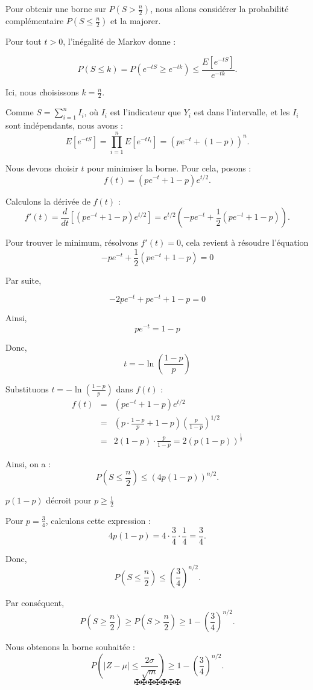 Pour obtenir une borne sur $P \left( S > \frac{n}{2} \right)$, nous allons
consid{\'e}rer la probabilit{\'e} compl{\'e}mentaire $P \left( S \leq
\frac{n}{2} \right)$ et la majorer.

Pour tout $t > 0$, l'in{\'e}galit{\'e} de Markov donne :


\[ P (S \leq k) = P (e^{- tS} \geq e^{- tk}) \leq \frac{E [e^{- tS}]}{e^{-
   tk}} . \]


Ici, nous choisissons $k = \frac{n}{2}$.

Comme $S = \sum_{i = 1}^n I_i$, o{\`u} $I_i$ est l'indicateur que $Y_i$ est
dans l'intervalle, et les $I_i$ sont ind{\'e}pendants, nous avons :
\[ E [e^{- tS}] = \prod_{i = 1}^n E [e^{- tI_i}] = (pe^{- t} + (1 - p))^n . \]


Nous devons choisir $t$ pour minimiser la borne. Pour cela, posons :
\[ f (t) = (pe^{- t} + 1 - p) e^{t / 2} . \]


Calculons la d{\'e}riv{\'e}e de $f (t)$ :
\[ f' (t) = \frac{d}{dt}  [(pe^{- t} + 1 - p) e^{t / 2}] = e^{t / 2}  \left( -
   pe^{- t} + \frac{1}{2} (pe^{- t} + 1 - p) \right) . \]


Pour trouver le minimum, r{\'e}solvons $f' (t) = 0$, cela revient {\`a}
r{\'e}soudre l'{\'e}quation
\[ - pe^{- t} + \frac{1}{2} (pe^{- t} + 1 - p) = 0 \]


Par suite,


\[ - 2 pe^{- t} + pe^{- t} + 1 - p = 0 \]


Ainsi,
\[ pe^{- t} = 1 - p \]


Donc,
\[ t = - \ln \left( \frac{1 - p}{p} \right) \]


Substituons $t = - \ln \left( \frac{1 - p}{p} \right)$ dans $f (t)$ :
\begin{eqnarray*}
  f (t) & = & (pe^{- t} + 1 - p) e^{t / 2} \\
  & = & \left( p \cdot \frac{1 - p}{p} + 1 - p \right) \left( \frac{p}{1 - p}
  \right)^{1 / 2}\\
  & = & 2 (1 - p) \cdot \frac{p}{1 - p} = 2 (p (1 - p))^{\frac{1}{2}}
\end{eqnarray*}


Ainsi, on a :
\[ P \left( S \leq \frac{n}{2} \right) \leq (4 p (1 - p))^{n / 2} . \]


$p (1 - p)$ d{\'e}croit pour $p \geq \frac{1}{2}$

Pour $p = \frac{3}{4}$, calculons cette expression :
\[ 4 p (1 - p) = 4 \cdot \frac{3}{4} \cdot \frac{1}{4} = \frac{3}{4} . \]


Donc,
\[ P \left( S \leq \frac{n}{2} \right) \leq \left( \frac{3}{4} \right)^{n / 2}
   . \]


Par cons{\'e}quent,
\[ P \left( S \geq \frac{n}{2} \right) \geq P \left( S > \frac{n}{2} \right)
   \geq 1 - \left( \frac{3}{4} \right)^{n / 2} . \]


Nous obtenons la borne souhait{\'e}e :
\[ P \left( |Z - \mu | \leq \frac{2 \sigma}{\sqrt{m}} \right) \geq 1 - \left(
   \frac{3}{4} \right)^{n / 2} . \]
\[ \maltese \maltese \maltese \maltese \maltese \maltese \maltese \]
